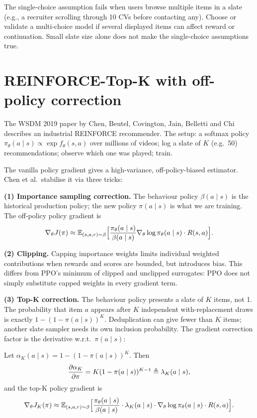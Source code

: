 \documentclass[11pt,oneside]{scrbook}
\begin{document}
\begin{remark}
The single-choice assumption fails when users browse multiple items in a
slate (e.g., a recruiter scrolling through 10 CVs before contacting any).
Choose or validate a multi-choice model if several displayed items
can affect reward or continuation. Small slate size alone does not make
the single-choice assumptions true.
\end{remark}

\section{REINFORCE-Top-K with off-policy correction}

The WSDM 2019 paper by Chen, Beutel, Covington, Jain, Belletti and
Chi describes an industrial REINFORCE recommender. The setup: a softmax policy
$\pi_\theta(a \mid s) \propto \exp f_\theta(s, a)$ over millions of videos;
log a slate of $K$ (e.g.\ 50) recommendations; observe which one was
played; train.

The vanilla policy gradient gives a high-variance, off-policy-biased
estimator. Chen et al.\ stabilise it via three tricks:

\textbf{(1) Importance sampling correction.} The behaviour policy
$\beta(a \mid s)$ is the historical production policy; the new policy
$\pi(a \mid s)$ is what we are training. The off-policy policy gradient is
\[
\nabla_\theta J(\pi) \approx \mathbb{E}_{(s, a, r) \sim \beta}\Big[\frac{\pi_\theta(a \mid s)}{\beta(a \mid s)} \nabla_\theta \log \pi_\theta(a \mid s) \cdot R(s, a)\Big].
\]

\textbf{(2) Clipping.} Capping importance weights limits individual weighted contributions
when rewards and scores are bounded, but introduces bias. This differs
from PPO's minimum of clipped and unclipped surrogates: PPO does not
simply substitute capped weights in every gradient term.

\textbf{(3) Top-K correction.}
The behaviour policy presents a slate of $K$ items, not 1. The probability
that item $a$ appears after $K$ independent with-replacement draws
is exactly $1-(1-\pi(a\mid s))^K$. Deduplication can give fewer than $K$
items; another slate sampler needs its own inclusion probability.
The gradient correction factor is the derivative w.r.t.\ $\pi(a \mid s)$:

\begin{theorem}
Let $\alpha_K(a \mid s) = 1 - (1 - \pi(a \mid s))^K$. Then
\[
\frac{\partial \alpha_K}{\partial \pi} = K (1 - \pi(a \mid s))^{K-1} \triangleq \lambda_K(a \mid s),
\]
and the top-K policy gradient is
\[
\nabla_\theta J_K(\pi) \approx \mathbb{E}_{(s, a, r) \sim \beta}\Big[\frac{\pi_\theta(a \mid s)}{\beta(a \mid s)} \cdot \lambda_K(a \mid s) \cdot \nabla_\theta \log \pi_\theta(a \mid s) \cdot R(s, a)\Big].
\]
\end{theorem}
\end{document}
